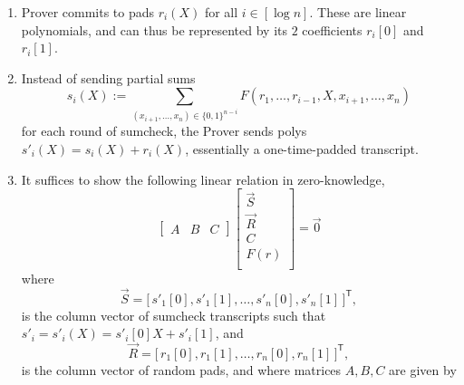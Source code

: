 \begin{mdframed}[style=zkprotocolwithheader, frametitle=Adding ZK to sumcheck]
    \begin{enumerate}
        \item Prover commits to pads $r_i(X)$ for all $i \in [\log n]$. These are linear polynomials, and can thus be represented by its $2$ coefficients $r_i[0]$ and $r_i[1]$.
        \item Instead of sending partial sums 
        \begin{equation*}
        s_i(X) := \sum_{(x_{i+1}, \dots, x_n) \in \{0,1\}^{n-i}} F(r_1, \dots, r_{i-1}, X, x_{i+1}, \dots, x_n)
        \end{equation*}
        for each round of sumcheck, the Prover sends polys $s'_i(X) = s_i(X) + r_i(X)$, essentially a one-time-padded transcript.
        \item It suffices to show the following linear relation in zero-knowledge, 
        \begin{equation*}
        \left[\begin{array}{c|c|c}
        A & B & C
        \end{array}\right]
        \left[\begin{array}{c}
            \vec{S} \\
            \hline
            \vec{R} \\
            \hline
            C \\
            F(r) \\
        \end{array}\right]
        = 
        \vec{0}
        \end{equation*}
        where
        \[
        \vec{S} = 
        \bigl[\, s'_1[0], s'_1[1], \dots, s'_n[0], s'_n[1] \,\bigr]^{\mathsf T}, 
        \]
        is the column vector of sumcheck transcripts such that $s'_i = s'_i(X) = s'_i[0]X + s'_i[1]$, and
        \[
        \vec{R} = 
        \bigl[\, r_1[0], r_1[1], \dots, r_n[0], r_n[1] \,\bigr]^{\mathsf T},
        \]
        is the column vector of random pads, and where matrices $A,B,C$ are given by


\end{enumerate}
\end{mdframed}
